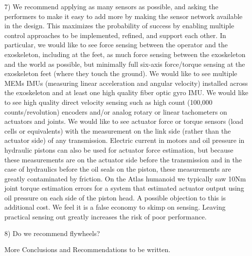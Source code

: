 \documentclass[letterpaper,12pt,fullpage]{article}
\begin{document}
7) We recommend applying as many sensors as possible, and asking the performers
to make it easy to add more by making the sensor network available in the design.
This maximizes the probability of success
by enabling multiple control
approaches to be implemented, refined, and support each other.
In particular, we would like to see force sensing between the operator and the
exoskeleton, including at the feet, as much force sensing between the exoskeleton 
and the world as possible, but minimally full six-axis force/torque sensing at
the exoskeleton feet (where they touch the ground). We would like to see multiple MEMs
IMUs (measuring linear acceleration and angular velocity) installed across 
the exoskeleton and at least one high quality fiber optic gyro IMU.
We would like to see high quality direct velocity sensing
such as high count (100,000 counts/revolution) encoders and/or 
analog rotary or linear tachometers on actuators and joints. 
We would like to see actuator force or torque sensors
(load cells or equivalents) with the measurement on the link side (rather than
the actuator side) of any transmission. Electric current in motors and oil
pressure in hydraulic pistons can also be used for actuator force estimation,
but because these measurements are on the actuator side before the transmission
and in the case of hydraulics before the oil seals on the piston, these measurements
are greatly contaminated by friction. On the Atlas humanoid we typically saw 10Nm
joint torque estimation errors for a system that estimated actuator output using
oil pressure on each side of the piston head.
A possible objection to this is additional cost. We feel it is a false
economy to skimp on sensing. Leaving practical sensing out greatly increases
the risk of poor performance.

8) Do we recommend flywheels?

More Conclusions and Recommendations to be written.



\end{document}
